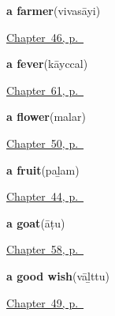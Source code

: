 \noindent\begin{minipage}[t]{\linewidth}
\raggedright
\textbf{a farmer}\enspace\emph{}\enspace(vivasāyi)\par
\footnotesize \hyperref[ch:ta-roles]{Chapter~46, p.~\pageref*{ch:ta-roles}}
\end{minipage}\par\smallskip

\noindent\begin{minipage}[t]{\linewidth}
\raggedright
\textbf{a fever}\enspace\emph{}\enspace(kāyccal)\par
\footnotesize \hyperref[ch:ta-how-the-body-feels]{Chapter~61, p.~\pageref*{ch:ta-how-the-body-feels}}
\end{minipage}\par\smallskip

\noindent\begin{minipage}[t]{\linewidth}
\raggedright
\textbf{a flower}\enspace\emph{}\enspace(malar)\par
\footnotesize \hyperref[ch:ta-at-the-doorway]{Chapter~50, p.~\pageref*{ch:ta-at-the-doorway}}
\end{minipage}\par\smallskip

\noindent\begin{minipage}[t]{\linewidth}
\raggedright
\textbf{a fruit}\enspace\emph{}\enspace(paḻam)\par
\footnotesize \hyperref[ch:ta-things-you-ask-for]{Chapter~44, p.~\pageref*{ch:ta-things-you-ask-for}}
\end{minipage}\par\smallskip

\noindent\begin{minipage}[t]{\linewidth}
\raggedright
\textbf{a goat}\enspace\emph{}\enspace(āṭu)\par
\footnotesize \hyperref[ch:ta-around-the-yard]{Chapter~58, p.~\pageref*{ch:ta-around-the-yard}}
\end{minipage}\par\smallskip

\noindent\begin{minipage}[t]{\linewidth}
\raggedright
\textbf{a good wish}\enspace\emph{}\enspace(vāḻttu)\par
\footnotesize \hyperref[ch:ta-courtesy]{Chapter~49, p.~\pageref*{ch:ta-courtesy}}
\end{minipage}\par\smallskip

